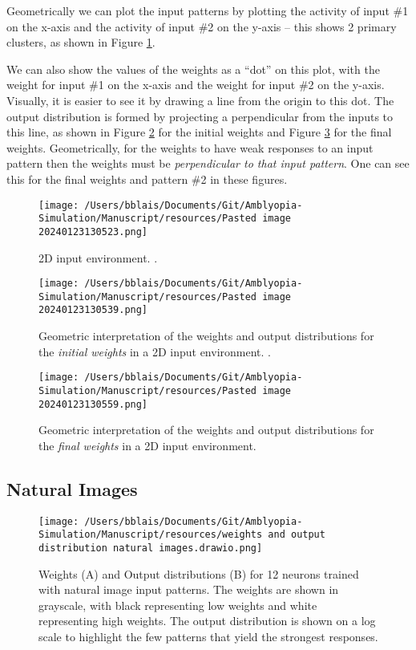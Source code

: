\documentclass[
]{article}
\begin{document}
Geometrically we can plot the input patterns by plotting the activity of
input \#1 on the x-axis and the activity of input \#2 on the y-axis --
this shows 2 primary clusters, as shown in Figure \ref{fig:2d_inputs}.

We can also show the values of the weights as a ``dot'' on this plot,
with the weight for input \#1 on the x-axis and the weight for input \#2
on the y-axis. Visually, it is easier to see it by drawing a line from
the origin to this dot. The output distribution is formed by projecting
a perpendicular from the inputs to this line, as shown in Figure
\ref{fig:2d_initial_weights_outputs} for the initial weights and Figure
\ref{fig:2d_final_weights_outputs} for the final weights. Geometrically,
for the weights to have weak responses to an input pattern then the
weights must be \emph{perpendicular to that input pattern}. One can see
this for the final weights and pattern \#2 in these figures.

\begin{figure}
\centering
\texttt{[image: /Users/bblais/Documents/Git/Amblyopia-Simulation/Manuscript/resources/Pasted image 20240123130523.png]}
\caption{2D input environment. .}\label{fig:2d_inputs}
\end{figure}

\begin{figure}
\centering
\texttt{[image: /Users/bblais/Documents/Git/Amblyopia-Simulation/Manuscript/resources/Pasted image 20240123130539.png]}
\caption{Geometric interpretation of the weights and output
distributions for the \emph{initial weights} in a 2D input environment.
.}\label{fig:2d_initial_weights_outputs}
\end{figure}

\begin{figure}
\centering
\texttt{[image: /Users/bblais/Documents/Git/Amblyopia-Simulation/Manuscript/resources/Pasted image 20240123130559.png]}
\caption{Geometric interpretation of the weights and output
distributions for the \emph{final weights} in a 2D input
environment.}\label{fig:2d_final_weights_outputs}
\end{figure}

\subsection{Natural Images}\label{sec:natural-images}

\begin{figure}
\centering
\texttt{[image: /Users/bblais/Documents/Git/Amblyopia-Simulation/Manuscript/resources/weights and output distribution natural images.drawio.png]}
\caption{Weights (A) and Output distributions (B) for 12 neurons trained
with natural image input patterns. The weights are shown in grayscale,
with black representing low weights and white representing high weights.
The output distribution is shown on a log scale to highlight the few
patterns that yield the strongest
responses.}\label{fig:nat_image_weights_and_output_dist}
\end{figure}
\end{document}
